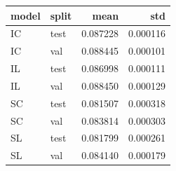 \begin{tabular}{llrr}
\toprule
model & split & mean & std \\
\midrule
IC & test & 0.087228 & 0.000116 \\
IC & val & 0.088445 & 0.000101 \\
IL & test & 0.086998 & 0.000111 \\
IL & val & 0.088450 & 0.000129 \\
SC & test & 0.081507 & 0.000318 \\
SC & val & 0.083814 & 0.000303 \\
SL & test & 0.081799 & 0.000261 \\
SL & val & 0.084140 & 0.000179 \\
\bottomrule
\end{tabular}
